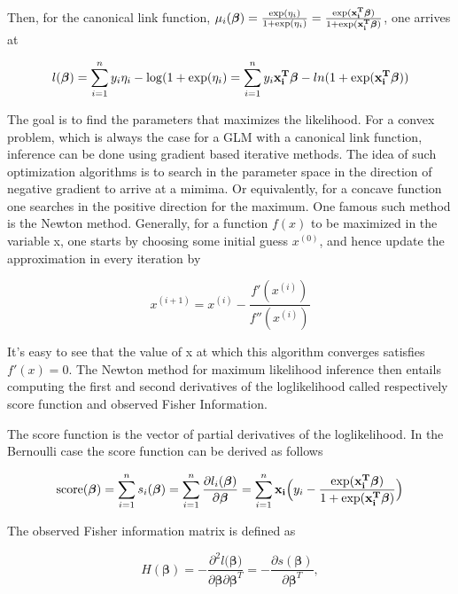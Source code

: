 Then, for the canonical link function, $\mu_i(\bm{\beta}) = \frac{\exp(\eta_i)}{1+\exp(\eta_i)} = \frac{\exp({\bf x_i^T} \bm{ \beta})}{1+\exp({\bf x_i^T} \bm{ \beta})}$, one arrives at

\begin{equation}
    l(\bm{\beta}) = \sum_{i=1}^{n} y_i \eta_i - \log(1 + \exp(\eta_i) = \sum_{i=1}^n y_i{\bf x_i^T} \bm{ \beta} - ln(1 + \exp(\bf x_i^T \bm{ \beta}))
\end{equation}

The goal is to find the parameters that maximizes the likelihood. For a convex problem, which is always the case for a GLM with a canonical link function, inference can be done using gradient based iterative methods. The idea of such optimization algorithms is to search in the parameter space in the direction of negative gradient to arrive at a mimima. Or equivalently, for a concave function one searches in the positive direction for the maximum. One famous such method is the Newton method. Generally, for a function $f(x)$ to be maximized in the variable x, one starts by choosing some initial guess $x^{(0)}$, and hence update the approximation in every iteration by

\begin{equation}
    x^{(i+1)} = x^{(i)} - \frac{f'(x^{(i)})}{f''(x^{(i)})}
\end{equation}

It's easy to see that the value of x at which this algorithm converges satisfies $f'(x)=0$. The Newton method for maximum likelihood inference then entails computing the first and second derivatives of the loglikelihood called respectively score function and observed Fisher Information.

The score function is the vector of partial derivatives of the loglikelihood. In the Bernoulli case the score function can be derived as follows

\begin{equation}
\label{eq:score}
\text{score}(\bm{\beta}) = \sum_{i=1}^{n}s_i(\bm{\beta}) = \sum_{i=1}^{n} \frac{\partial l_i(\bm{\beta})}{\partial \bm{\beta}} = \sum_{i=1}^{n} {\bf x_i} \Big ( y_i - \frac{\exp({\bf x_i^T} \bm{ \beta})}{1 + \exp({\bf x_i^T} \bm{ \beta})}\Big )
\end{equation}

The observed Fisher information matrix is defined as 

\begin{equation}
    H(\bm {\beta}) = - \frac{\partial^2 l(\bm {\beta)}}{\partial \bm{\beta} \partial \bm{\beta}^T} = -\frac{\partial s(\bm{\beta})}{\partial \bm{\beta}^T},
\end{equation}

